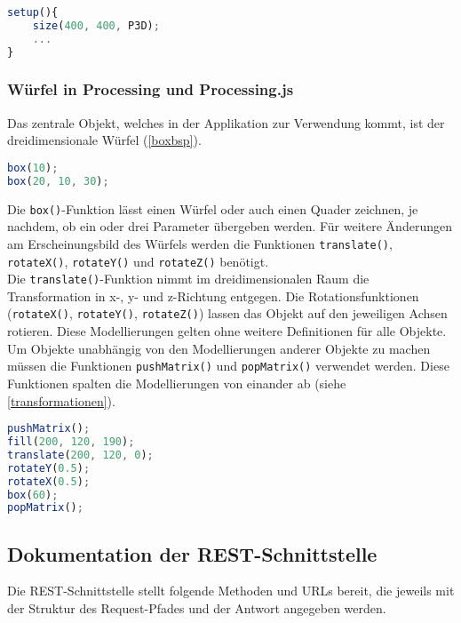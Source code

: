 \documentclass[12pt, ngerman, utf8]{article}
\begin{document}
\begin{lstlisting}[language=JavaScript, caption={setup()-Funktion},label=setupbsp]
setup(){
    size(400, 400, P3D);
    ...
}
\end{lstlisting}

\subsubsection{Würfel in Processing und Processing.js}
Das zentrale Objekt, welches in der Applikation zur Verwendung kommt, ist der dreidimensionale Würfel (\ref{boxbsp}). 
\begin{lstlisting}[language=JavaScript, caption={box()-Funktion},label=boxbsp]
box(10);
box(20, 10, 30);
\end{lstlisting}
Die \texttt{box()}-Funktion lässt einen Würfel oder auch einen Quader zeichnen, je nachdem, ob ein oder drei Parameter übergeben werden. Für weitere Änderungen am Erscheinungsbild des Würfels werden die Funktionen \texttt{translate()}, \texttt{rotateX()}, \texttt{rotateY()} und \texttt{rotateZ()} benötigt.\\
Die \texttt{translate()}-Funktion nimmt im dreidimensionalen Raum die Transformation in x-, y- und z-Richtung entgegen. Die Rotationsfunktionen (\texttt{rotateX()}, \texttt{rotateY()}, \texttt{rotateZ()}) lassen das Objekt auf den jeweiligen Achsen rotieren. Diese Modellierungen gelten ohne weitere Definitionen für alle Objekte. Um Objekte unabhängig von den Modellierungen anderer Objekte zu machen müssen die Funktionen \texttt{pushMatrix()} und \texttt{popMatrix()} verwendet werden. Diese Funktionen spalten die Modellierungen von einander ab (siehe \ref{transformationen}).
\begin{lstlisting}[language=JavaScript, caption={Modellierungsfunktionen},label=transformationen]
pushMatrix();
fill(200, 120, 190);
translate(200, 120, 0);
rotateY(0.5);
rotateX(0.5);
box(60);
popMatrix();
\end{lstlisting}

\subsection{Dokumentation der REST-Schnittstelle}
Die REST-Schnittstelle stellt folgende Methoden und URLs bereit, die jeweils mit der Struktur des Request-Pfades und der Antwort angegeben werden.\\\\
\end{document}
